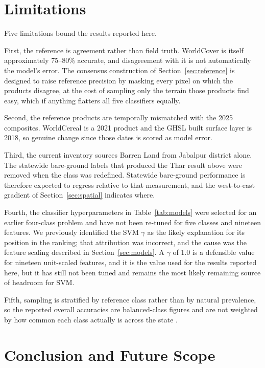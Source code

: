 \documentclass[conference]{IEEEtran}
\begin{document}
\section{Limitations}

Five limitations bound the results reported here.

First, the reference is agreement rather than field truth. WorldCover is
itself approximately 75--80\% accurate, and disagreement with it is not
automatically the model's error. The consensus construction of
Section~\ref{sec:reference} is designed to raise reference precision by
masking every pixel on which the products disagree, at the cost of
sampling only the terrain those products find easy, which if anything
flatters all five classifiers equally.

Second, the reference products are temporally mismatched with the 2025
composites. WorldCereal is a 2021 product and the GHSL built surface
layer is 2018, so genuine change since those dates is scored as model
error.

Third, the current inventory sources Barren Land from Jabalpur district
alone. The statewide bare-ground labels that produced the Thar result
above were removed when the class was redefined. Statewide bare-ground
performance is therefore expected to regress relative to that
measurement, and the west-to-east gradient of
Section~\ref{sec:spatial} indicates where.

Fourth, the classifier hyperparameters in Table~\ref{tab:models} were
selected for an earlier four-class problem and have not been re-tuned
for five classes and nineteen features. We previously identified the SVM
$\gamma$ as the likely explanation for its position in the ranking; that
attribution was incorrect, and the cause was the feature scaling
described in Section~\ref{sec:models}. A $\gamma$ of 1.0 is a defensible
value for nineteen unit-scaled features, and it is the value used for
the results reported here, but it has still not been tuned and remains
the most likely remaining source of headroom for SVM.

Fifth, sampling is stratified by reference class rather than by natural
prevalence, so the reported overall accuracies are balanced-class
figures and are not weighted by how common each class actually is across
the state \cite{ref30}.

\section{Conclusion and Future Scope}
\end{document}
